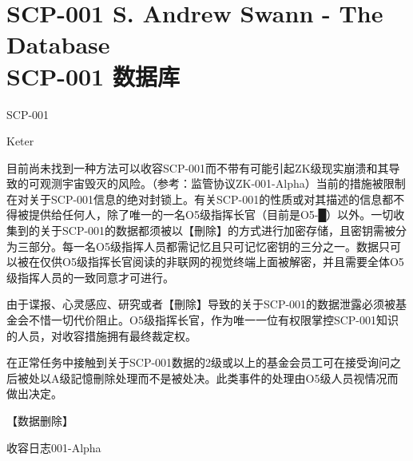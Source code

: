 \chapter[SCP-001 数据库]{
	SCP-001 S. Andrew Swann - The Database \\
	SCP-001 数据库
}

\label{chap:SCP-001.the.database}

 SCP-001

 Keter

目前尚未找到一种方法可以收容SCP-001而不带有可能引起ZK级现实崩溃和其导致的可观测宇宙毁灭的风险。（参考：监管协议ZK-001-Alpha）当前的措施被限制在对关于SCP-001信息的绝对封锁上。有关SCP-001的性质或对其描述的信息都不得被提供给任何人，除了唯一的一名O5级指挥长官（目前是O5-█）以外。一切收集到的关于SCP-001的数据都须被以【刪除】的方式进行加密存储，且密钥需被分为三部分。每一名O5级指挥人员都需记忆且只可记忆密钥的三分之一。数据只可以被在仅供O5级指挥长官阅读的非联网的视觉终端上面被解密，并且需要全体O5级指挥人员的一致同意才可进行。

由于谍报、心灵感应、研究或者【刪除】导致的关于SCP-001的数据泄露必须被基金会不惜一切代价阻止。O5级指挥长官，作为唯一一位有权限掌控SCP-001知识的人员，对收容措施拥有最终裁定权。

在正常任务中接触到关于SCP-001数据的2级或以上的基金会员工可在接受询问之后被处以A级記憶刪除处理而不是被处决。此类事件的处理由O5级人员视情况而做出决定。

【数据删除】

 收容日志001-Alpha

